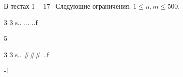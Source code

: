 В тестах $1-17$  Следующие ограничения: $1 \leq n,m \leq 500$.


\begin{myverbbox}[\small]{\vinput}
    3 3
    s..
    ...
    ..f
\end{myverbbox}
\begin{myverbbox}[\small]{\voutput}
    5
\end{myverbbox}


\begin{myverbbox}[\small]{\vinput}
    3 3
    s..
    ###
    ..f
\end{myverbbox}
\begin{myverbbox}[\small]{\voutput}
    -1
\end{myverbbox}

